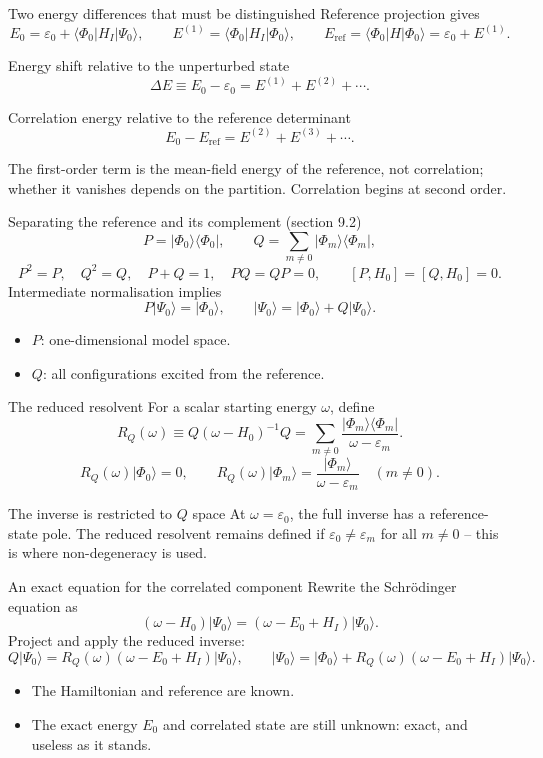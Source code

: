 \documentclass[aspectratio=169,10pt]{beamer}
\newcommand{\ket}[1]{\vert #1\rangle}
\newcommand{\bra}[1]{\langle #1\vert}
\newcommand{\mel}[3]{\langle #1\lvert #2\rvert #3\rangle}
\newcommand{\Eref}{E_{\mathrm{ref}}}
\newcommand{\ph}{\Phi_0}
\newcommand{\Psizero}{\Psi_0}
\begin{document}
\begin{frame}{Two energy differences that must be distinguished}
Reference projection gives
\[
E_0=\varepsilon_0+\mel{\ph}{H_I}{\Psizero},\qquad
E^{(1)}=\mel{\ph}{H_I}{\ph},
\qquad
\Eref=\mel{\ph}{H}{\ph}=\varepsilon_0+E^{(1)}.
\]
\begin{block}{Energy shift relative to the unperturbed state}
\[\Delta E\equiv E_0-\varepsilon_0=E^{(1)}+E^{(2)}+\cdots.\]
\end{block}
\begin{exampleblock}{Correlation energy relative to the reference determinant}
\[E_0-\Eref=E^{(2)}+E^{(3)}+\cdots.\]
\end{exampleblock}
\small The first-order term is the mean-field energy of the reference, not correlation; whether it vanishes depends on the partition. Correlation begins at second order.
\end{frame}

\begin{frame}{Separating the reference and its complement (section 9.2)}
\[
P=\ket{\ph}\bra{\ph},\qquad
Q=\sum_{m\ne0}\ket{\Phi_m}\bra{\Phi_m},
\]
\[
P^2=P,\quad Q^2=Q,\quad P+Q=1,\quad PQ=QP=0,
\qquad
[P,H_0]=[Q,H_0]=0.
\]
Intermediate normalisation implies
\[
P\ket{\Psizero}=\ket{\ph},\qquad
\boxed{\ket{\Psizero}=\ket{\ph}+Q\ket{\Psizero}.}
\]
\begin{itemize}
\item \(P\): one-dimensional model space.
\item \(Q\): all configurations excited from the reference.
\end{itemize}
\end{frame}

\begin{frame}{The reduced resolvent}
For a scalar starting energy \(\omega\), define
\[
\boxed{R_Q(\omega)\equiv Q(\omega-H_0)^{-1}Q
=\sum_{m\ne0}\frac{\ket{\Phi_m}\bra{\Phi_m}}
 {\omega-\varepsilon_m}.}
\]
\[
R_Q(\omega)\ket{\ph}=0,\qquad
R_Q(\omega)\ket{\Phi_m}=
\frac{\ket{\Phi_m}}{\omega-\varepsilon_m}\quad(m\ne0).
\]
\begin{block}{The inverse is restricted to \(Q\) space}
At \(\omega=\varepsilon_0\), the full inverse has a reference-state pole. The reduced resolvent remains defined if \(\varepsilon_0\ne\varepsilon_m\) for all \(m\ne0\) -- this is where non-degeneracy is used.
\end{block}
\end{frame}

\begin{frame}{An exact equation for the correlated component}
Rewrite the Schr\"odinger equation as
\[
(\omega-H_0)\ket{\Psizero}=(\omega-E_0+H_I)\ket{\Psizero}.
\]
Project and apply the reduced inverse:
\[
Q\ket{\Psizero}=R_Q(\omega)(\omega-E_0+H_I)\ket{\Psizero},
\qquad
\boxed{\ket{\Psizero}=\ket{\ph}
+R_Q(\omega)(\omega-E_0+H_I)\ket{\Psizero}.}
\]
\begin{itemize}
\item The Hamiltonian and reference are known.
\item The exact energy \(E_0\) and correlated state are still unknown: exact, and useless as it stands.
\end{itemize}
\end{frame}
\end{document}
